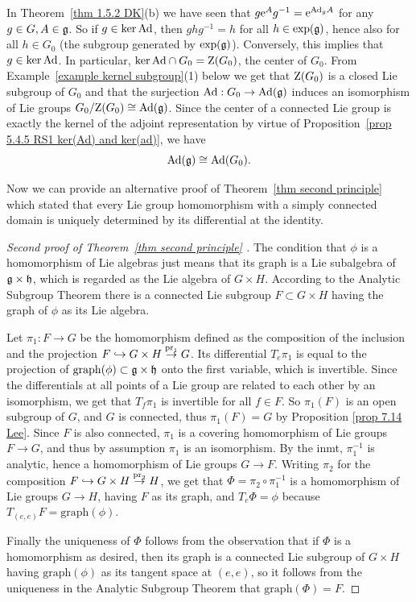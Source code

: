 \begin{example}
    In Theorem~\ref{thm 1.5.2 DK}(b) we have seen that $g\mathrm{e}^A g^{-1}=\mathrm{e}^{\mathrm{Ad}_g A}$ for any $g\in G,A\in\mathfrak{g}$. So if $g\in\ker \mathrm{Ad}$, then $ghg^{-1}=h$ for all $h\in \exp(\mathfrak{g})$, hence also for all $h\in G_0$ (the subgroup generated by $\exp(\mathfrak{g})$). Conversely, this implies that $g\in\ker \mathrm{Ad}$. In particular, $\ker\mathrm{Ad}\cap G_0=\mathrm{Z}(G_0)$, the center of $G_0$. From Example~\ref{example kernel subgroup}(1) below we get that $\mathrm{Z}(G_0)$ is a closed Lie subgroup of $G_0$ and that the surjection $\mathrm{Ad}:G_0\to \mathrm{Ad}(\mathfrak{g})$ induces an isomorphism of Lie groups $G_0\slash \mathrm{Z}(G_0)\cong \mathrm{Ad}(\mathfrak{g})$. Since the center of a connected Lie group is exactly the kernel of
    the adjoint representation by virtue of Proposition~\ref{prop 5.4.5 RS1 ker(Ad) and ker(ad)}, we have 
    \[\mathrm{Ad}(\mathfrak{g})\cong \mathrm{Ad}(G_0).\]
\end{example}



Now we can provide an alternative proof of Theorem~\ref{thm second principle} which stated that every Lie group homomorphism with a simply connected domain is uniquely determined by its differential at the identity.


\begin{proof}[Second proof of Theorem~\ref{thm second principle} {{\cite[Cor.~1.10.5]{DK}}}]
    The condition that $\phi$ is a homomorphism of Lie algebras just means that its graph is a Lie subalgebra of $\mathfrak{g}\times\mathfrak{h}$, which is regarded as the Lie algebra of $G\times H$. According to the Analytic Subgroup Theorem there is a connected Lie subgroup $F\subset G\times H$ having the graph of $\phi$ as its Lie algebra.

    Let $\pi_1:F\to G$ be the homomorphism defined as the composition of the inclusion and the projection $F\hookrightarrow G\times H\overset{\operatorname{pr}_1}{\to} G$. Its differential $T_e \pi_1$ is equal to the projection of $\mathrm{graph}(\phi)\subset \mathfrak{g}\times\mathfrak{h}$ onto the first variable, which is invertible. Since the differentials at all points of a Lie group are related to each other by an isomorphism, we get that $T_f\pi_1$ is invertible for all $f\in F$. So $\pi_1(F)$ is an open subgroup of $G$, and $G$ is connected, thus $\pi_1(F)=G$ by Proposition \ref{prop 7.14 Lee}. Since $F$ is also connected, $\pi_1$ is a covering homomorphism of Lie groups $F\to G$, and thus by assumption $\pi_1$ is an isomorphism. By the \gls{inmt}, $\pi_1^{-1}$ is analytic, hence a homomorphism of Lie groups $G\to F$. Writing $\pi_2$ for the composition $F\hookrightarrow G\times H\overset{\operatorname{pr}_2}{\to} H$, we get that $\Phi=\pi_2\circ \pi_1^{-1}$ is a homomorphism of Lie groups $G\to H$, having $F$ as its graph, and $T_e \Phi=\phi$ because $T_{(e,e)}F=\mathrm{graph}(\phi)$.

    Finally the uniqueness of $\Phi$ follows from the observation that if $\Phi$ is a homomorphism as desired, then its graph is a connected Lie subgroup of $G\times H$ having $\mathrm{graph}(\phi)$ as its tangent space at $(e,e)$, so it follows from the uniqueness in the Analytic Subgroup Theorem that $\mathrm{graph}(\Phi)=F$.
\end{proof}


